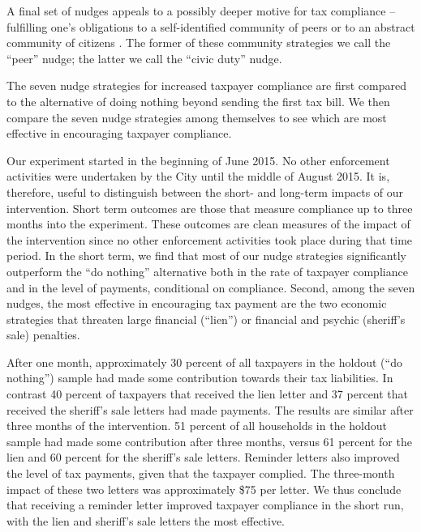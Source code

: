 \documentclass[12pt]{article}
\begin{document}
A final set of nudges appeals to a possibly deeper motive for tax
compliance -- fulfilling one's obligations to a self-identified
community of peers \cite{Posner-00} or to an abstract community of
citizens \cite{Rawls-71}.  The former of these community strategies we
call the ``peer'' nudge; the latter we call the ``civic duty'' nudge.  

The seven nudge strategies for increased taxpayer compliance are first
compared to the alternative of doing nothing beyond sending the first
tax bill.  We then compare the seven nudge strategies among themselves
to see which are most effective in encouraging taxpayer compliance.

Our experiment started in the beginning of June 2015. No other enforcement
activities were undertaken by the City until the middle of August
2015. It is, therefore, useful to distinguish between the short- and
long-term impacts of our intervention. Short term outcomes are those
that measure compliance up to three months into the experiment. These
outcomes are clean measures of the impact of the intervention since no
other enforcement activities took place during that time period.  In
the short term, we find that most of our nudge strategies
significantly outperform the ``do nothing'' alternative both in the
rate of taxpayer compliance and in the level of payments, conditional
on compliance.  Second, among the seven nudges, the most effective in
encouraging tax payment are the two economic strategies that threaten
large financial (``lien'') or financial and psychic (sheriff's sale)
penalties.

After one month, approximately 30 percent of all taxpayers in the
holdout (``do nothing'') sample had made some contribution towards their tax
liabilities. In contrast 40 percent of taxpayers that received the
lien letter and 37 percent that received the sheriff's sale letters had
made payments. The results are similar after three months of the
intervention.  51 percent of all households in the holdout sample had
made some contribution after three months, versus 61 percent for the lien and
60 percent for the sheriff's sale letters. Reminder letters also
improved the level of tax payments, given that the taxpayer
complied. The three-month impact of these two letters was
approximately \$75 per letter. We thus conclude that receiving a
reminder letter improved taxpayer compliance in the short run, with
the lien and sheriff's sale letters the most effective.
\end{document}
